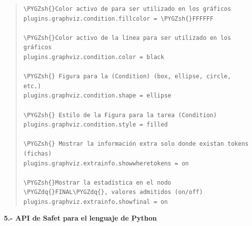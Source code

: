 \documentclass[letterpaper,11pt,spanish]{sphinxmanual}
\def\PYGZsh{\char`\#}
\def\PYGZdq{\char`\"}
\begin{document}
\begin{quote}
\begin{Verbatim}[commandchars=\\\{\}]
\PYGZsh{}Color activo de para ser utilizado en los gráficos
plugins.graphviz.condition.fillcolor = \PYGZsh{}FFFFFF

\PYGZsh{}Color activo de la línea para ser utilizado en los gráficos
plugins.graphviz.condition.color = black

\PYGZsh{} Figura para la (Condition) (box, ellipse, circle, etc.)
plugins.graphviz.condition.shape = ellipse

\PYGZsh{} Estilo de la Figura para la tarea (Condition)
plugins.graphviz.condition.style = filled

\PYGZsh{} Mostrar la información extra solo donde existan tokens (fichas)
plugins.graphviz.extrainfo.showwheretokens = on

\PYGZsh{}Mostrar la estadística en el nodo \PYGZdq{}FINAL\PYGZdq{}, valores admitidos (on/off)
plugins.graphviz.extrainfo.showfinal = on
\end{Verbatim}
\end{quote}

\textbf{5.- API de Safet para el lenguaje de Python}
\end{document}
